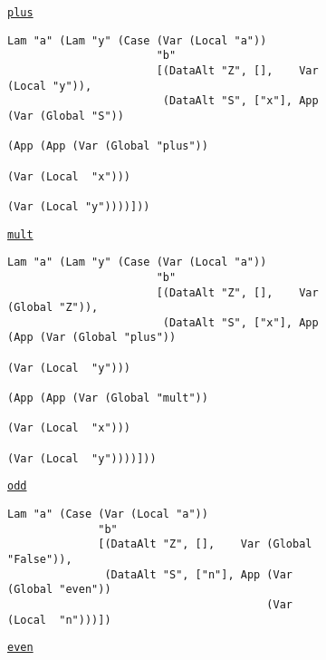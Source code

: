 \begin{figure}
  \begin{subfigure}[plus]{\textwidth}
    \begin{small}
      \underline{\texttt{plus}}
      \begin{verbatim}
Lam "a" (Lam "y" (Case (Var (Local "a"))
                       "b"
                       [(DataAlt "Z", [],    Var (Local "y")),
                        (DataAlt "S", ["x"], App (Var (Global "S"))
                                                 (App (App (Var (Global "plus"))
                                                           (Var (Local  "x")))
                                                      (Var (Local "y"))))]))
      \end{verbatim}
    \end{small}
  \end{subfigure}
  \begin{subfigure}[mult]{\textwidth}
    \begin{small}
      \underline{\texttt{mult}}
      \begin{verbatim}
Lam "a" (Lam "y" (Case (Var (Local "a"))
                       "b"
                       [(DataAlt "Z", [],    Var (Global "Z")),
                        (DataAlt "S", ["x"], App (App (Var (Global "plus"))
                                                      (Var (Local  "y")))
                                                 (App (App (Var (Global "mult"))
                                                           (Var (Local  "x")))
                                                      (Var (Local  "y"))))]))
      \end{verbatim}
    \end{small}
  \end{subfigure}
  \begin{subfigure}[odd]{\textwidth}
    \begin{small}
      \underline{\texttt{odd}}
      \begin{verbatim}
Lam "a" (Case (Var (Local "a"))
              "b"
              [(DataAlt "Z", [],    Var (Global "False")),
               (DataAlt "S", ["n"], App (Var (Global "even"))
                                        (Var (Local  "n")))])
      \end{verbatim}
    \end{small}
  \end{subfigure}
  \begin{subfigure}[even]{\textwidth}
    \begin{small}
      \underline{\texttt{even}}

\end{small}
\end{subfigure}
\end{figure}
